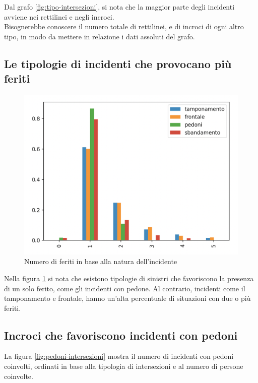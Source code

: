 \documentclass[a4paper]{report}
\begin{document}
Dal grafo \ref{fig:tipo-intersezioni}, 
si nota che la maggior parte degli incidenti avviene nei rettilinei e negli incroci.\\
Bisognerebbe conoscere il numero totale di rettilinei, e di incroci di ogni altro tipo, in 
modo da mettere in relazione i dati assoluti del grafo.


\subsection{Le tipologie di incidenti che provocano più feriti}

\begin{figure}
    \includegraphics[width=\linewidth]{../src/incidenti/incidenti_senza_coords/natura_incidente/numero_feriti.png}
    \caption{Numero di feriti in base alla natura dell'incidente}
    \label{fig:numero-feriti}
\end{figure}

Nella figura \ref{fig:numero-feriti} si nota che esistono tipologie di sinistri che 
favoriscono la presenza di un solo ferito, come gli incidenti con pedone. 
Al contrario, incidenti come il tamponamento e frontale, 
hanno un'alta percentuale di situazioni con due o più feriti.


\subsection{Incroci che favoriscono incidenti con pedoni}

La figura \ref{fig:pedoni-intersezioni} mostra il numero di incidenti con pedoni coinvolti, 
ordinati in base alla tipologia di intersezioni e al numero di persone coinvolte.
\end{document}
